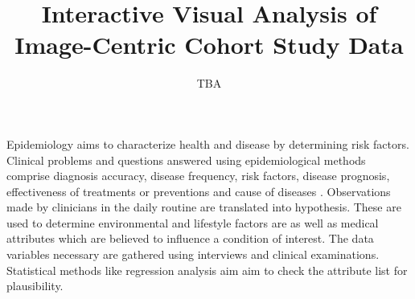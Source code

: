 \documentclass[journal]{style/vgtc}           %
\title{Interactive Visual Analysis of Image-Centric Cohort Study Data}
\author{TBA}
\begin{document}


\maketitle

Epidemiology aims to characterize health and disease by determining risk factors.
%
Clinical problems and questions answered using epidemiological methods comprise diagnosis accuracy, disease frequency, risk factors, disease prognosis, effectiveness of treatments or preventions and cause of diseases \cite{Fletcher2012}.
%
%
Observations made by clinicians in the daily routine are translated into hypothesis.
%
These are used to determine environmental and lifestyle factors are as well as medical attributes which are believed to influence a condition of interest.
%
The data variables necessary are gathered using interviews and clinical examinations.
%
Statistical methods like regression analysis aim aim to check the attribute list for plausibility.
%
\end{document}
